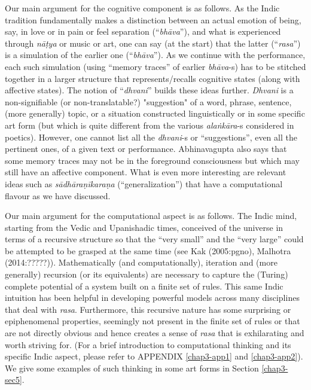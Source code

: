Our main argument for the cognitive component is as follows. As the Indic tradition fundamentally makes a distinction between an actual emotion of being, say, in love or in pain or feel separation (“\textsl{bhāva}”), and what is experienced through \textsl{nāṭya} or music or art, one can say (at the start) that the latter (“\textsl{rasa}”) is a simulation of the earlier one (“\textsl{bhāva}”). As we continue with the performance, each such simulation (using “memory traces” of earlier \textsl{bhāva}-s) has to be stitched together in a larger structure that represents/recalls cognitive states (along with affective states). The notion of “\textsl{dhvani}” builds these ideas further. \textsl{Dhvani} is a non-signifiable (or non-translatable?) "suggestion" of a word, phrase, sentence, (more generally) topic, or a situation constructed linguistically or in some specific art form (but which is quite different from the various \textsl{alaṅkāra}-s considered in poetics). However, one cannot list all the \textsl{dhvani}-s or “suggestions”, even all the pertinent ones, of a given text or performance. Abhinavagupta also says that some memory traces may not be in the foreground consciousness but which may still have an affective component. What is even more interesting are relevant ideas such as \textsl{sādhāraṇīkaraṇa} (“generalization”) that have a computational flavour as we have discussed.

Our main argument for the computational aspect is as follows. The Indic mind, starting from the Vedic and Upanishadic times, conceived of the universe in terms of a recursive structure so that the “very small” and the “very large” could be attempted to be grasped at the same time (see Kak (2005:pgno), Malhotra (2014:?????)). Mathematically (and computationally), iteration and (more generally) recursion (or its equivalents) are necessary to capture the (Turing) complete potential of a system built on a finite set of rules. This same Indic intuition has been helpful in developing powerful models across many disciplines that deal with \textsl{rasa}. Furthermore, this recursive nature has some surprising or epiphenomenal properties, seemingly not present in the finite set of rules or that are not directly obvious and hence creates a sense of \textsl{rasa} that is exhilarating and worth striving for. (For a brief introduction to computational thinking and its specific Indic aspect, please refer to APPENDIX \ref{chap3-app1} and \ref{chap3-app2}). We give some examples of such thinking in some art forms in Section \ref{chap3-sec5}.

